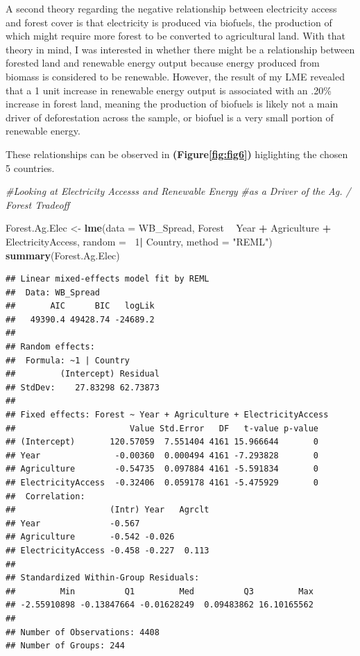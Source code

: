\documentclass[12pt,]{article}
\newenvironment{Shaded}{\begin{snugshade}}{\end{snugshade}}
\newcommand{\KeywordTok}[1]{\textcolor[rgb]{0.13,0.29,0.53}{\textbf{#1}}}
\newcommand{\DataTypeTok}[1]{\textcolor[rgb]{0.13,0.29,0.53}{#1}}
\newcommand{\DecValTok}[1]{\textcolor[rgb]{0.00,0.00,0.81}{#1}}
\newcommand{\StringTok}[1]{\textcolor[rgb]{0.31,0.60,0.02}{#1}}
\newcommand{\CommentTok}[1]{\textcolor[rgb]{0.56,0.35,0.01}{\textit{#1}}}
\newcommand{\OperatorTok}[1]{\textcolor[rgb]{0.81,0.36,0.00}{\textbf{#1}}}
\newcommand{\NormalTok}[1]{#1}
\begin{document}
A second theory regarding the negative relationship between electricity
access and forest cover is that electricity is produced via biofuels,
the production of which might require more forest to be converted to
agricultural land. With that theory in mind, I was interested in whether
there might be a relationship between forested land and renewable energy
output because energy produced from biomass is considered to be
renewable. However, the result of my LME revealed that a 1 unit increase
in renewable energy output is associated with an .20\% increase in
forest land, meaning the production of biofuels is likely not a main
driver of deforestation across the sample, or biofuel is a very small
portion of renewable energy.

These relationships can be observed in \textbf{(Figure\ref{fig:fig6})}
higlighting the chosen 5 countries.

\begin{Shaded}
\begin{Highlighting}[]
\CommentTok{#Looking at Electricity Accesss and Renewable Energy }
\CommentTok{#as a Driver of the Ag. / Forest Tradeoff}

\NormalTok{Forest.Ag.Elec <-}\StringTok{ }\KeywordTok{lme}\NormalTok{(}\DataTypeTok{data =}\NormalTok{ WB_Spread, }
\NormalTok{                    Forest }\OperatorTok{~}\StringTok{ }\NormalTok{Year }\OperatorTok{+}\StringTok{ }\NormalTok{Agriculture }\OperatorTok{+}\StringTok{ }\NormalTok{ElectricityAccess,}
                    \DataTypeTok{random =} \OperatorTok{~}\DecValTok{1}\OperatorTok{|}\StringTok{ }\NormalTok{Country,}
                    \DataTypeTok{method =} \StringTok{"REML"}\NormalTok{)}
\KeywordTok{summary}\NormalTok{(Forest.Ag.Elec)}
\end{Highlighting}
\end{Shaded}

\begin{verbatim}
## Linear mixed-effects model fit by REML
##  Data: WB_Spread 
##       AIC      BIC   logLik
##   49390.4 49428.74 -24689.2
## 
## Random effects:
##  Formula: ~1 | Country
##         (Intercept) Residual
## StdDev:    27.83298 62.73873
## 
## Fixed effects: Forest ~ Year + Agriculture + ElectricityAccess 
##                       Value Std.Error   DF   t-value p-value
## (Intercept)       120.57059  7.551404 4161 15.966644       0
## Year               -0.00360  0.000494 4161 -7.293828       0
## Agriculture        -0.54735  0.097884 4161 -5.591834       0
## ElectricityAccess  -0.32406  0.059178 4161 -5.475929       0
##  Correlation: 
##                   (Intr) Year   Agrclt
## Year              -0.567              
## Agriculture       -0.542 -0.026       
## ElectricityAccess -0.458 -0.227  0.113
## 
## Standardized Within-Group Residuals:
##         Min          Q1         Med          Q3         Max 
## -2.55910898 -0.13847664 -0.01628249  0.09483862 16.10165562 
## 
## Number of Observations: 4408
## Number of Groups: 244
\end{verbatim}
\end{document}
